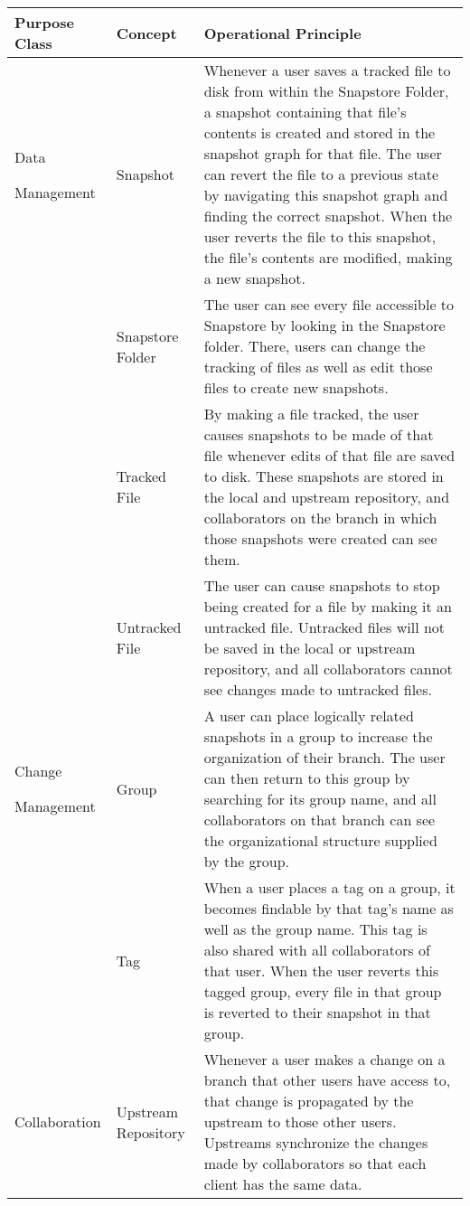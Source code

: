 \begin{table}
\begin{tabular}{ |p{2.5cm}||p{3.25cm}||p{10.5cm}|}
 \hline
 \textbf{Purpose Class} & \textbf{Concept} & \textbf{Operational Principle}\\[8pt]
 \hline
 \parbox[t]{3cm}{Data \par Management\strut} & Snapshot & Whenever a user saves a tracked file to disk from within the Snapstore Folder, a snapshot containing that file’s contents is created and stored in the snapshot graph for that file. The user can revert the file to a previous state by navigating this snapshot graph and finding the correct snapshot. When the user reverts the file to this snapshot, the file’s contents are modified, making a new snapshot.\\[8pt]
  & Snapstore Folder & The user can see every file accessible to Snapstore by looking in the Snapstore folder. There, users can change the tracking of files as well as edit those files to create new snapshots.\\[8pt]
  & Tracked File & By making a file tracked, the user causes snapshots to be made of that file whenever edits of that file are saved to disk. These snapshots are stored in the local and upstream repository, and collaborators on the branch in which those snapshots were created can see them.\\[8pt]
  & Untracked File & The user can cause snapshots to stop being created for a file by making it an untracked file. Untracked files will not be saved in the local or upstream repository, and all collaborators cannot see changes made to untracked files.\\[8pt]
 \hline
 \parbox[t]{3cm}{Change \par Management\strut} & Group & A user can place logically related snapshots in a group to increase the organization of their branch. The user can then return to this group by searching for its group name, and all collaborators on that branch can see the organizational structure supplied by the group.\\[8pt]
  & Tag & When a user places a tag on a group, it becomes findable by that tag’s name as well as the group name. This tag is also shared with all collaborators of that user. When the user reverts this tagged group, every file in that group is reverted to their snapshot in that group.\\[8pt]
 \hline
 Collaboration & Upstream Repository & Whenever a user makes a change on a branch that other users have access to, that change is propagated by the upstream to those other users. Upstreams synchronize the changes made by collaborators so that each client has the same data.\\[8pt]

\end{tabular}
\end{table}
